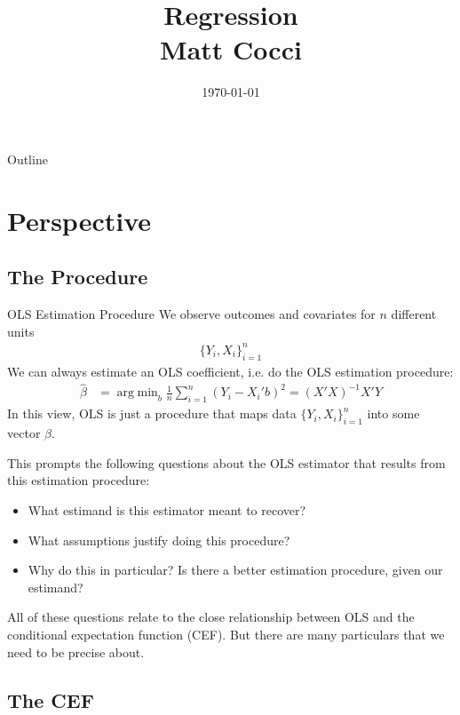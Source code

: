 \documentclass[aspectratio=169, handout]{beamer}
\title[]{Regression \\ Matt Cocci}
\author[]{}
\date{\today}
\DeclareMathOperator*{\argmin}{arg\;min}
\begin{document}
\begin{frame}[plain]
\titlepage
\end{frame}


\begin{frame}{Outline}
\tableofcontents[hideallsubsections]
\end{frame}


\section{Perspective}

\subsection{The Procedure}


{\scriptsize
\begin{frame}{OLS Estimation Procedure}
We observe outcomes and covariates for $n$ different units
\begin{align*}
  \{Y_i,X_i\}_{i=1}^n
\end{align*}
We can always \alert{estimate} an OLS coefficient, i.e.
do the OLS \alert{estimation procedure}:
\begin{align*}
  \hat{\beta}
  &=
  \argmin_b
  \frac{1}{n}
  \sum_{i=1}^n
  (Y_i-X_i'b)^2
  =
  (X'X)^{-1}X'Y
\end{align*}
In this view, OLS is just a \alert{procedure} that maps data
$\{Y_i,X_i\}_{i=1}^n$ into some vector $\hat{\beta}$.

This prompts the following questions about the \alert{OLS estimator}
that results from this \alert{estimation procedure}:
\begin{itemize}
  \item
    \alert{What estimand} is this estimator meant to recover?

  \item \alert{What assumptions} justify doing this procedure?

  \item \alert{Why} do this in particular?
    Is there a better estimation procedure, given our estimand?
\end{itemize}
All of these questions relate to the close relationship between OLS and
the \alert{conditional expectation function} (\alert{CEF}).
But there are many particulars that we need to be precise about.
\end{frame}
}


\subsection{The CEF}
\end{document}
